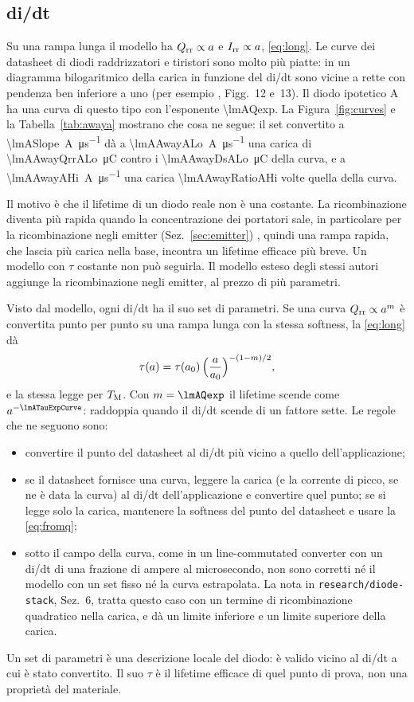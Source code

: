 \documentclass[10pt,a4paper]{scrartcl}
\let\newcommand\pdvaluedefine
\newcommand{\Irr}{I_\mathrm{rr}}
\newcommand{\Qrr}{Q_\mathrm{rr}}
\newcommand{\TM}{T_\mathrm{M}}
\begin{document}
\subsection{di/dt}
\label{sec:slope}
Su una rampa lunga il modello ha $\Qrr \propto a$ e $\Irr \propto a$, \eqref{eq:long}. Le curve dei datasheet di diodi raddrizzatori e tiristori sono molto più piatte: in un diagramma bilogaritmico della carica in funzione del di/dt sono vicine a rette con pendenza ben inferiore a uno (per esempio \cite{an5950}, Figg.~12 e~13). Il diodo ipotetico A ha una curva di questo tipo con l'esponente \num{\lmAQexp}. La Figura~\ref{fig:curves} e la Tabella~\ref{tab:awaya} mostrano che cosa ne segue: il set convertito a \SI{\lmASlope}{\ampere\per\micro\second} dà a \SI{\lmAAwayALo}{\ampere\per\micro\second} una carica di \SI{\lmAAwayQrrALo}{\micro\coulomb} contro i \SI{\lmAAwayDsALo}{\micro\coulomb} della curva, e a \SI{\lmAAwayAHi}{\ampere\per\micro\second} una carica \num{\lmAAwayRatioAHi} volte quella della curva.

Il motivo è che il lifetime di un diodo reale non è una costante. La ricombinazione diventa più rapida quando la concentrazione dei portatori sale, in particolare per la ricombinazione negli emitter (Sez.~\ref{sec:emitter}) \cite{schlangenotto1969}, quindi una rampa rapida, che lascia più carica nella base, incontra un lifetime efficace più breve. Un modello con $\tau$ costante non può seguirla. Il modello esteso degli stessi autori \cite{ma1993} aggiunge la ricombinazione negli emitter, al prezzo di più parametri.

Visto dal modello, ogni di/dt ha il suo set di parametri. Se una curva $\Qrr \propto a^{m}$ è convertita punto per punto su una rampa lunga con la stessa softness, la \eqref{eq:long} dà
\begin{equation}
\tau(a) = \tau(a_0)\,\Bigl(\frac{a}{a_0}\Bigr)^{-(1-m)/2} ,
\label{eq:taucurve}
\end{equation}
e la stessa legge per $\TM$. Con $m = \lmAQexp$ il lifetime scende come $a^{-\lmATauExpCurve}$: raddoppia quando il di/dt scende di un fattore sette. Le regole che ne seguono sono:
\begin{itemize}
\item convertire il punto del datasheet al di/dt più vicino a quello dell'applicazione;
\item se il datasheet fornisce una curva, leggere la carica (e la corrente di picco, se ne è data la curva) al di/dt dell'applicazione e convertire quel punto; se si legge solo la carica, mantenere la softness del punto del datasheet e usare la \eqref{eq:fromq};
\item sotto il campo della curva, come in un line-commutated converter con un di/dt di una frazione di ampere al microsecondo, non sono corretti né il modello con un set fisso né la curva estrapolata. La nota in \texttt{research/diode-stack}, Sez.~6, tratta questo caso con un termine di ricombinazione quadratico nella carica, e dà un limite inferiore e un limite superiore della carica.
\end{itemize}
Un set di parametri è una descrizione locale del diodo: è valido vicino al di/dt a cui è stato convertito. Il suo $\tau$ è il lifetime efficace di quel punto di prova, non una proprietà del materiale.
\end{document}
